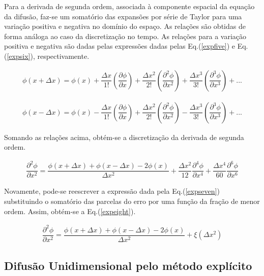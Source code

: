 	Para a derivada de segunda ordem, associada à componente espacial da equação da difusão, faz-se um somatório das expansões por série de Taylor para uma variação positiva e negativa no domínio do espaço. As relações são obtidas de forma análoga ao caso da discretização no tempo.
	As relações para a variação positiva e negativa são dadas pelas expressões dadas pelas Eq.(\ref{expfive}) e Eq.(\ref{expsix}), respectivamente.
	
\begin{align}
\label{expfive}
\phi(x + \Delta x) = \phi(x) + \dfrac{\Delta x}{1!} \left(\dfrac{\partial \phi}{\partial x} \right) + \dfrac{\Delta x^2}{2!} \left(\dfrac{\partial^2 \phi}{\partial x^2} \right) + \dfrac{\Delta x^3}{3!} \left(\dfrac{\partial^3 \phi}{\partial x^3} \right) + ...
\end{align}

\begin{align}
\label{expsix}
\phi(x - \Delta x) = \phi(x) - \dfrac{\Delta x}{1!} \left(\dfrac{\partial \phi}{\partial x} \right) + \dfrac{\Delta x^2}{2!} \left(\dfrac{\partial^2 \phi}{\partial x^2} \right) - \dfrac{\Delta x^3}{3!} \left(\dfrac{\partial^3 \phi}{\partial x^3} \right) + ...
\end{align}

	Somando as relações acima, obtém-se a discretização da derivada de segunda ordem.
	
\begin{align}
\label{expseven}
\dfrac{\partial^2 \phi}{\partial x^2} = \dfrac{\phi(x + \Delta x) + \phi(x - \Delta x) - 2 \phi(x)}{\Delta x^2} + \dfrac{\Delta x^2}{12} \dfrac{\partial^4 \phi}{\partial x^4} + \dfrac{\Delta x^4}{60} \dfrac{\partial^6 \phi}{\partial x^6}
\end{align}

	Novamente, pode-se reescrever a expressão dada pela Eq.(\ref{expseven}) substituindo o somatório das parcelas do erro por uma função da fração de menor ordem. Assim, obtém-se a Eq.(\ref{expeight}).
	
\begin{align}
\label{expeight}
\dfrac{\partial^2 \phi}{\partial x^2} = \dfrac{\phi(x + \Delta x) + \phi(x - \Delta x) - 2 \phi(x)}{\Delta x^2} + \xi(\Delta x^2)
\end{align}

\subsection{Difusão Unidimensional pelo método explícito}
\noindent


